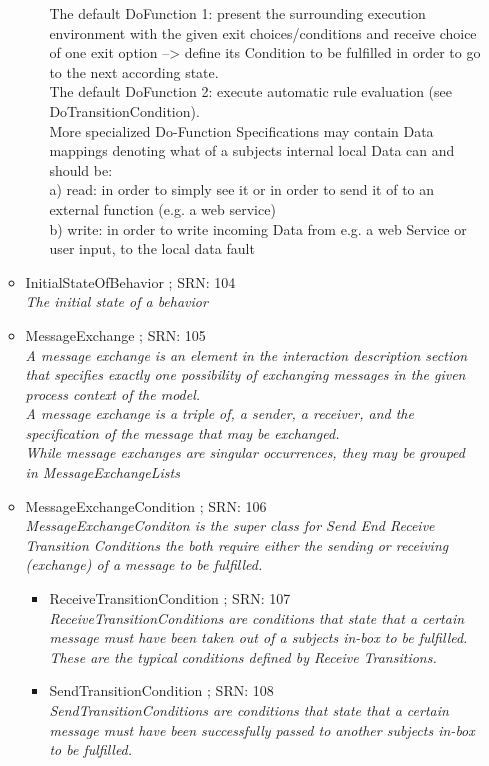 \begin{itemize}
\begin{itemize}
\begin{itemize}
{			The default DoFunction 1: present the surrounding execution environment with the given exit choices/conditions and receive choice of one exit option --> define its Condition to be fulfilled in order to go to the next according state.\\
			The default DoFunction 2: execute automatic rule evaluation (see DoTransitionCondition).\\
			More specialized Do-Function Specifications may contain Data mappings denoting what of a subjects internal local Data can and should be:\\
			a) read: in order to simply see it or in order to send it of to an external function (e.g. a web service)\\
			b) write: in order to write incoming Data from e.g. a web Service or user input, to the local data fault}
	\end{itemize}
	\item InitialStateOfBehavior ; SRN: 104 \\ \textit{The initial state of a behavior}
	\item MessageExchange ; SRN: 105 \\ \textit{A message exchange is an element in the interaction description section that specifies exactly one possibility of exchanging messages in the given process context of the model.\\
	A message exchange is a triple of, a sender, a receiver, and the specification of the message that may be exchanged.\\
	While message exchanges are singular occurrences, they may be grouped in MessageExchangeLists}
	\item MessageExchangeCondition ; SRN: 106 \\ \textit{MessageExchangeConditon is the super class for Send End Receive Transition Conditions the both require either the sending or receiving (exchange) of a message to be fulfilled.}
	\begin{itemize}
		\item ReceiveTransitionCondition ; SRN: 107 \\ \textit{ReceiveTransitionConditions are conditions that state that a certain message must have been taken out of a subjects in-box to be fulfilled.\\
		These are the typical conditions defined by Receive Transitions.}
		\item SendTransitionCondition ; SRN: 108 \\ \textit{SendTransitionConditions are conditions that state that a certain message must have been successfully passed to another subjects in-box to be fulfilled.\\
}
\end{itemize}
\end{itemize}
\end{itemize}
